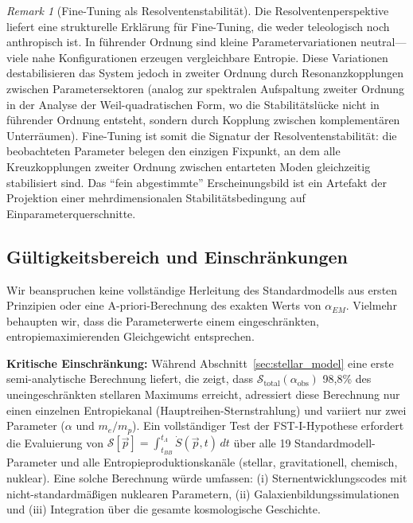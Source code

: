 \documentclass[12pt,a4paper]{article}
\theoremstyle{remark}
\newtheorem{remark}{Remark}
\begin{document}
\begin{remark}[Fine-Tuning als Resolventenstabilit\"at]
\label{rem:fine-tuning-resolvent}
Die Resolventenperspektive \citep{GeigerRH2026b} liefert eine strukturelle Erkl\"arung f\"ur Fine-Tuning, die weder teleologisch noch anthropisch ist. In f\"uhrender Ordnung sind kleine Parametervariationen neutral---viele nahe Konfigurationen erzeugen vergleichbare Entropie. Diese Variationen destabilisieren das System jedoch in zweiter Ordnung durch Resonanzkopplungen zwischen Parametersektoren (analog zur spektralen Aufspaltung zweiter Ordnung in der Analyse der Weil-quadratischen Form, wo die Stabilit\"atsl\"ucke nicht in f\"uhrender Ordnung entsteht, sondern durch Kopplung zwischen komplement\"aren Unterr\"aumen). Fine-Tuning ist somit die Signatur der Resolventenstabilit\"at: die beobachteten Parameter belegen den einzigen Fixpunkt, an dem alle Kreuzkopplungen zweiter Ordnung zwischen entarteten Moden gleichzeitig stabilisiert sind. Das ``fein abgestimmte'' Erscheinungsbild ist ein Artefakt der Projektion einer mehrdimensionalen Stabilit\"atsbedingung auf Einparameterquerschnitte.
\end{remark}

\subsection{G\"ultigkeitsbereich und Einschr\"ankungen}

Wir beanspruchen keine vollst\"andige Herleitung des Standardmodells aus ersten Prinzipien oder eine A-priori-Berechnung des exakten Werts von $\alpha_{EM}$. Vielmehr behaupten wir, dass die Parameterwerte einem eingeschr\"ankten, entropiemaximierenden Gleichgewicht entsprechen.

\textbf{Kritische Einschr\"ankung:} W\"ahrend Abschnitt~\ref{sec:stellar_model} eine erste semi-analytische Berechnung liefert, die zeigt, dass $\mathcal{S}_{\text{total}}(\alpha_{\text{obs}})$ 98,8\% des uneingeschr\"ankten stellaren Maximums erreicht, adressiert diese Berechnung nur einen einzelnen Entropiekanal (Hauptreihen-Sternstrahlung) und variiert nur zwei Parameter ($\alpha$ und $m_e/m_p$). Ein vollst\"andiger Test der FST-I-Hypothese erfordert die Evaluierung von $\mathcal{S}[\vec{p}] = \int_{t_{BB}}^{t_\Lambda} \dot{S}(\vec{p}, t)\,dt$ \"uber alle 19 Standardmodell-Parameter und alle Entropieproduktionskan\"ale (stellar, gravitationell, chemisch, nuklear). Eine solche Berechnung w\"urde umfassen: (i) Sternentwicklungscodes mit nicht-standardm\"a\ss{}igen nuklearen Parametern, (ii) Galaxienbildungssimulationen und (iii) Integration \"uber die gesamte kosmologische Geschichte.
\end{document}
